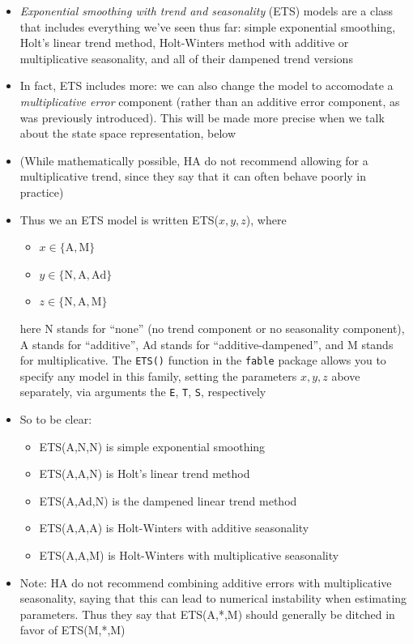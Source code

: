 \documentclass{article}
\begin{document}
\begin{itemize}
\item \emph{Exponential smoothing with trend and seasonality} (ETS) models are a
  class that includes everything we've seen thus far: simple exponential
  smoothing, Holt's linear trend method, Holt-Winters method with additive or
  multiplicative seasonality, and all of their dampened trend versions  

\item In fact, ETS includes more: we can also change the model to accomodate a  
  \emph{multiplicative error} component (rather than an additive error
  component, as was previously introduced). This will be made more precise when
  we talk about the state space representation, below 

\item (While mathematically possible, HA do not recommend allowing for a
  multiplicative trend, since they say that it can often behave poorly in
  practice) 

\item Thus we an ETS model is written ETS($x,y,z$), where 
  \begin{itemize}
  \item $x \in \{ \text{A}, \text{M} \}$
  \item $y \in \{ \text{N}, \text{A}, \text{Ad} \}$
  \item $z \in \{ \text{N}, \text{A}, \text{M} \}$
  \end{itemize}
  here N stands for ``none'' (no trend component or no seasonality component), A
  stands for ``additive'', Ad stands for ``additive-dampened'', and M stands for
  multiplicative. The \verb|ETS()| function in the \verb|fable| package allows
  you to specify any model in this family, setting the parameters $x,y,z$ above 
  separately, via arguments the \verb|E|, \verb|T|, \verb|S|, respectively 

\item So to be clear:
  \begin{itemize}
  \item ETS(A,N,N) is simple exponential smoothing
  \item ETS(A,A,N) is Holt's linear trend method
  \item ETS(A,Ad,N) is the dampened linear trend method
  \item ETS(A,A,A) is Holt-Winters with additive seasonality
  \item ETS(A,A,M) is Holt-Winters with multiplicative seasonality
  \end{itemize}

\item Note: HA do not recommend combining additive errors with multiplicative
  seasonality, saying that this can lead to numerical instability when
  estimating parameters. Thus they say that ETS(A,*,M) should generally be
  ditched in favor of ETS(M,*,M)   
\end{itemize}
\end{document}
